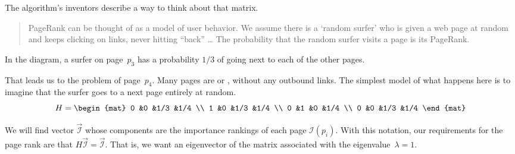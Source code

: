 The algorithm's inventors describe a way to think about that matrix. 
\begin{quotation}
PageRank can be thought of as a model of user behavior. 
We assume there is a `random surfer' who is
given a web page at random and keeps clicking on links, 
never hitting ``back'' \ldots 
The probability that the random surfer visits a page is its PageRank.
\cite{BrinPage}
\end{quotation}
In the diagram, a surfer on page~$p_3$ has a probability $1/3$ of going 
next to each of the other pages. 

That leads us to the problem of page~$p_4$.
Many pages are
 or ,
without any outbound links.
The simplest model of what happens here is to 
imagine that the surfer 
goes to a next page entirely at random.
\begin{equation*}
  H=\begin{mat}
    0   &0  &1/3  &1/4   \\
    1   &0  &1/3  &1/4   \\
    0   &1  &0    &1/4 \\
    0   &0  &1/3  &1/4
  \end{mat}
\end{equation*}

We will find vector $\vec{\mathcal{I}}$ whose components are the
importance rankings of each page $\mathcal{I}(p_i)$.
With this notation, 
our requirements for the page rank are that 
$H\vec{\mathcal{I}}=\vec{\mathcal{I}}$.
That is, we want an eigenvector of the matrix associated with the
eigenvalue~$\lambda=1$.

